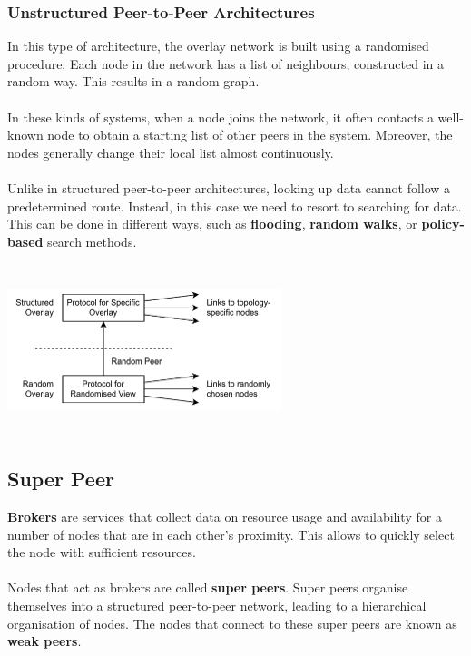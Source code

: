 \documentclass{article}
\begin{document}
\subsubsection{Unstructured Peer-to-Peer Architectures}
In this type of architecture, the overlay network is built using a randomised procedure. Each node in the network has a list of neighbours, constructed in a random way. This results in a random graph. \\ \\
In these kinds of systems, when a node joins the network, it often contacts a well-known node to obtain a starting list of other peers in the system. Moreover, the nodes generally change their local list almost continuously. \\ \\
Unlike in structured peer-to-peer architectures, looking up data cannot follow a predetermined route. Instead, in this case we need to resort to searching for data. This can be done in different ways, such as \textbf{flooding}, \textbf{random walks}, or \textbf{policy-based} search methods.

\begin{center}
	\includegraphics[width=8cm, height=5cm, keepaspectratio]{assets/unstructured.pdf}
\end{center}

\subsection{Super Peer}
\textbf{Brokers} are services that collect data on resource usage and availability for a number of nodes that are in each other's proximity. This allows to quickly select the node with sufficient resources. \\ \\
Nodes that act as brokers are called \textbf{super peers}. Super peers organise themselves into a structured peer-to-peer network, leading to a hierarchical organisation of nodes. The nodes that connect to these super peers are known as \textbf{weak peers}.
\end{document}
